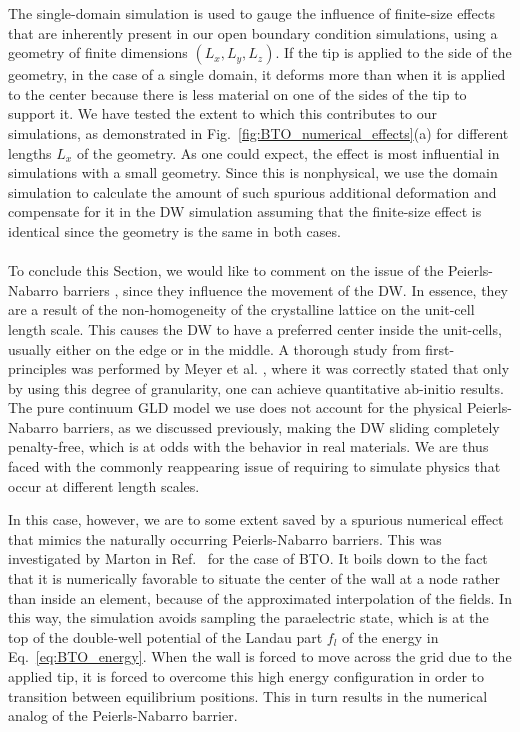 The single-domain simulation is used to gauge the influence of finite-size effects that are inherently present in our open boundary condition simulations, using a geometry of finite dimensions $(L_x, L_y, L_z)$.
If the tip is applied to the side of the geometry, in the case of a single domain, it deforms more than when it is applied to the center because there is less material on one of the sides of the tip to support it.
We have tested the extent to which this contributes to our simulations, as demonstrated in Fig.~\ref{fig:BTO_numerical_effects}(a) for different lengths $L_x$ of the geometry. As one could expect, the effect is most influential in simulations with a small geometry.
Since this is nonphysical, we use the domain simulation to calculate the amount of such spurious additional deformation and compensate for it in the DW simulation assuming that the finite-size effect is identical since the geometry is the same in both cases.
\\\\
To conclude this Section, we would like to comment on the issue of the Peierls-Nabarro barriers \cite{Peierls1940,Nabarro1947}, since they influence the movement of the DW.
In essence, they are a result of the non-homogeneity of the crystalline lattice on the unit-cell length scale.
This causes the DW to have a preferred center inside the unit-cells, usually either on the edge or in the middle.
A thorough study from first-principles was performed by Meyer et al. \cite{Meyer2002}, where it was correctly stated that only by using this degree of granularity, one can achieve quantitative ab-initio results.
The pure continuum GLD model we use does not account for the physical Peierls-Nabarro barriers, as we discussed previously, making the DW sliding completely penalty-free, which is at odds with the behavior in real materials.
We are thus faced with the commonly reappearing issue of requiring to simulate physics that occur at different length scales.

In this case, however, we are to some extent saved by a spurious numerical effect that mimics the naturally occurring Peierls-Nabarro barriers.
This was investigated by Marton in Ref.~\cite{Marton2018} for the case of BTO.
It boils down to the fact that it is numerically favorable to situate the center of the wall at a node rather than inside an element, because of the approximated interpolation of the fields.
In this way, the simulation avoids sampling the paraelectric state, which is at the top of the double-well potential of the Landau part $f_l$ of the energy in Eq.~\eqref{eq:BTO_energy}.
When the wall is forced to move across the grid due to the applied tip, it is forced to overcome this high energy configuration in order to transition between equilibrium positions.
This in turn results in the numerical analog of the Peierls-Nabarro barrier.

